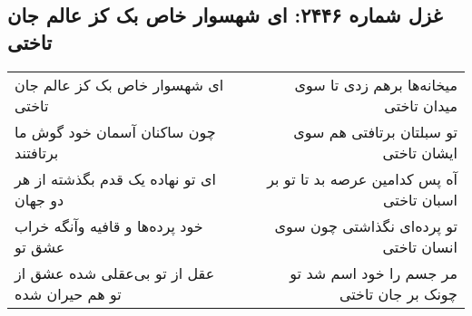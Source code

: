 \begin{center}
\section*{غزل شماره ۲۴۴۶: ای شهسوار خاص بک کز عالم جان تاختی}
\label{sec:2446}
\begin{longtable}{l p{0.5cm} r}
ای شهسوار خاص بک کز عالم جان تاختی
&&
میخانه‌ها برهم زدی تا سوی میدان تاختی
\\
چون ساکنان آسمان خود گوش ما برتافتند
&&
تو سبلتان برتافتی هم سوی ایشان تاختی
\\
ای تو نهاده یک قدم بگذشته از هر دو جهان
&&
آه پس کدامین عرصه بد تا تو بر اسبان تاختی
\\
خود پرده‌ها و قافیه وآنگه خراب عشق تو
&&
تو پرده‌ای نگذاشتی چون سوی انسان تاختی
\\
عقل از تو بی‌عقلی شده عشق از تو هم حیران شده
&&
مر جسم را خود اسم شد تو چونک بر جان تاختی
\\
\end{longtable}
\end{center}
